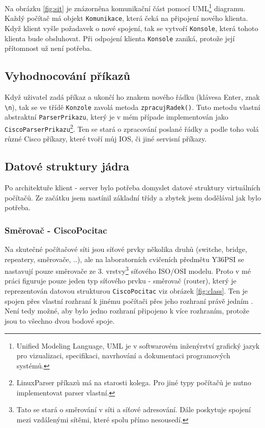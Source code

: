 Na obrázku \ref{fig:sit} je znázorněna komunikační část pomocí UML\footnote{Unified Modeling Language, UML je v softwarovém inženýrství grafický jazyk pro vizualizaci, specifikaci, navrhování a dokumentaci programových systémů.\cite{wiki:uml}} diagramu. Každý počítač má objekt \verb|Komunikace|, která čeká na připojení nového klienta. Když klient vyšle požadavek o nové spojení, tak se vytvoří \verb|Konsole|, která tohoto klienta bude obsluhovat. Při odpojení klienta \verb|Konsole| zaniká, protože její přítomnost už není potřeba.

\subsection{Vyhodnocování příkazů}
Když uživatel zadá příkaz a ukončí ho znakem nového řádku (klávesa Enter, znak \verb|\n|), tak se ve třídě \verb|Konzole| zavolá metoda \verb|zpracujRadek()|. Tuto metodu vlastní abstraktní \verb|ParserPrikazu|, který je v mém případe implementován jako \verb|CiscoParserPrikazu|\footnote{LinuxParser příkazů má na starosti kolega. Pro jiné typy počítačů je nutno implementovat parser vlastní.}. Ten se stará o zpracování poslané řádky a podle toho volá různé Cisco příkazy, které tvoří můj IOS, či jiné servisní příkazy.


\subsection{Datové struktury jádra}

Po architektuře klient - server bylo potřeba domyslet datové struktury virtuálních počítačů. Ze začátku jsem nastínil základní třídy a zbytek jsem dodělával jak bylo potřeba. 

\subsubsection{Směrovač - CiscoPocitac}
Na skutečné počítačové síti jsou síťové prvky několika druhů (switche, bridge, repeatery, směrovače, ..), ale na laboratorních cvičeních předmětu Y36PSI se  nastavují pouze směrovače ze 3. vrstvy\footnote{Tato  se stará o směrování v síti a síťové adresování. Dále poskytuje spojení mezi vzdálenými sítěmi, které spolu přímo nesousedí.} síťového ISO/OSI modelu. Proto v mé práci figuruje pouze jeden typ síťového prvku - směrovač (router), který je reprezentován datovou strukturou \verb|CiscoPocitac| viz obrázek \ref{fig:class}. Ten je spojen přes vlastní rozhraní k jinému počítači přes jeho rozhraní právě jedním . Není tedy možné, aby bylo jedno rozhraní připojeno k více rozhraním, protože jsou to všechno dvou bodové spoje. 


